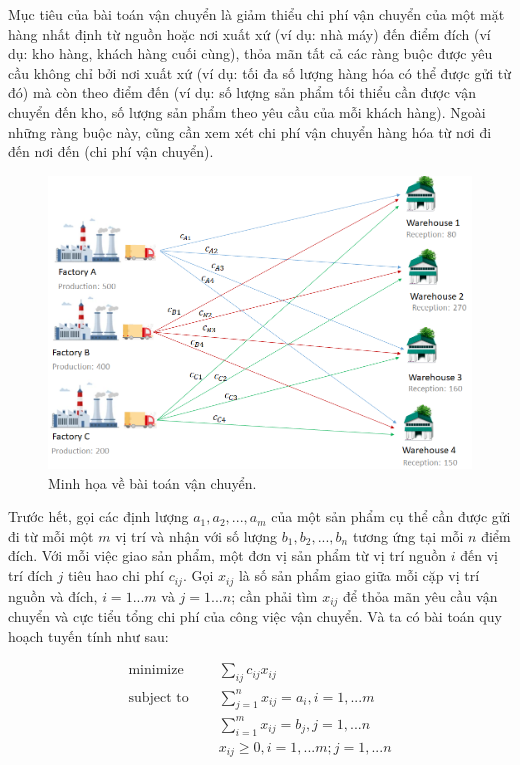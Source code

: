 Mục tiêu của bài toán vận chuyển là giảm thiểu chi phí vận chuyển của một mặt hàng nhất định từ nguồn hoặc nơi xuất xứ (ví dụ: nhà máy) đến điểm đích (ví dụ: kho hàng, khách hàng cuối cùng), thỏa mãn tất cả các ràng buộc được yêu cầu không chỉ bởi nơi xuất xứ (ví dụ: tối đa số lượng hàng hóa có thể được gửi từ đó) mà còn theo điểm đến (ví dụ: số lượng sản phẩm tối thiểu cần được vận chuyển đến kho, số lượng sản phẩm theo yêu cầu của mỗi khách hàng). Ngoài những ràng buộc này, cũng cần xem xét chi phí vận chuyển hàng hóa từ nơi đi đến nơi đến (chi phí vận chuyển).

\begin{figure}[h!]
    \includegraphics[width=0.85\linewidth]{figures/transport-problem.png}
    \caption{Minh họa về bài toán vận chuyển.}
    \label{fig:flow_network}
\end{figure}

Trước hết, gọi các định lượng $a_1, a_2, ..., a_m$ của một sản phẩm cụ thể cần được gửi đi từ mỗi một $m$ vị trí và nhận với số lượng $b_1, b_2, ..., b_n$ tương ứng tại mỗi $n$ điểm đích. Với mỗi việc giao sản phẩm, một đơn vị sản phẩm từ vị trí nguồn $i$ đến vị trí đích $j$ tiêu hao chi phí $c_{ij}$. Gọi $x_{ij}$ là số sản phẩm giao giữa mỗi cặp vị trí nguồn và đích, $i= 1...m$ và $j=1...n$; cần phải tìm $x_{ij}$ để thỏa mãn yêu cầu vận chuyển và cực tiểu tổng chi phí của công việc vận chuyển. Và ta có bài toán quy hoạch tuyến tính như sau:

\begin{equation}
    \label{eq:transport_problem}
    \begin{aligned}
        \text{minimize } \quad & \sum_{ij} c_{ij}x_{ij}\\
        \text{subject to }\quad & \sum_{j=1}^nx_{ij} = a_i, i = 1, ...m \\ 
        & \sum_{i=1}^mx_{ij} = b_j, j = 1, ...n \\ 
            & x_{ij} \geq 0, i = 1, ...m; j = 1, ...n
    \end{aligned}   
\end{equation}


